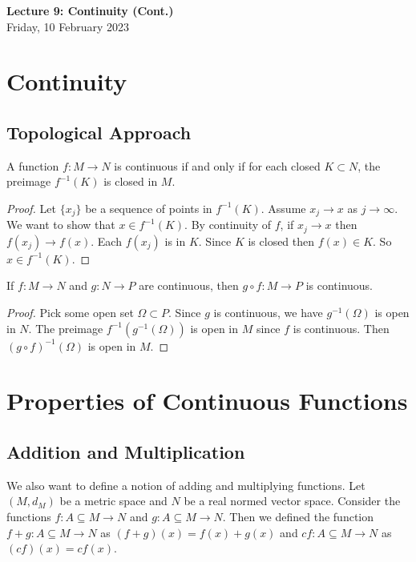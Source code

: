\documentclass[11pt]{article}
\theoremstyle{definition}
\begin{document}
\thispagestyle{empty}

\begin{center}
{\LARGE \bf Lecture 9: Continuity (Cont.)}\\
{\large Friday, 10 February 2023}\\

\end{center}

\section{Continuity}
\subsection{Topological Approach}
\prop A function $f:M\to N$ is continuous if and only if for each closed $K\subset N$, the preimage $f^{-1}(K)$ is closed in $M$.

\begin{proof}
    Let $\{x_j\}$ be a sequence of points in $f^{-1}(K)$. Assume $x_j\to x$ as $j\to \infty$. We want to show that $x\in f^{-1}(K)$. By continuity of $f$, if $x_j\to x$ then $f(x_j)\to f(x)$. Each $f(x_j)$ is in $K$. Since $K$ is closed then $f(x)\in K$. So $x\in f^{-1}(K)$.
\end{proof}

\prop If $f:M\to N$ and $g:N\to P$ are continuous, then $g\circ f:M\to P$ is continuous.

\begin{proof}
    Pick some open set $\Omega\subset P$. Since $g$ is continuous, we have $g^{-1}(\Omega)$ is open in $N$. The preimage $f^{-1}(g^{-1}(\Omega))$ is open in $M$ since $f$ is continuous. Then $(g\circ f)^{-1}(\Omega)$ is open in $M$.
\end{proof}

\section{Properties of Continuous Functions}

\subsection{Addition and Multiplication}
We also want to define a notion of adding and multiplying functions. Let $(M,d_M)$ be a metric space and $N$ be a real normed vector space. Consider the functions $f:A\subseteq M\to N$ and $g:A\subseteq M\to N$. Then we defined the function $f+g:A\subseteq M\to N$ as $(f+g)(x)=f(x)+g(x)$ and $cf:A\subseteq M\to N$ as $(cf)(x)=cf(x)$.
\end{document}

